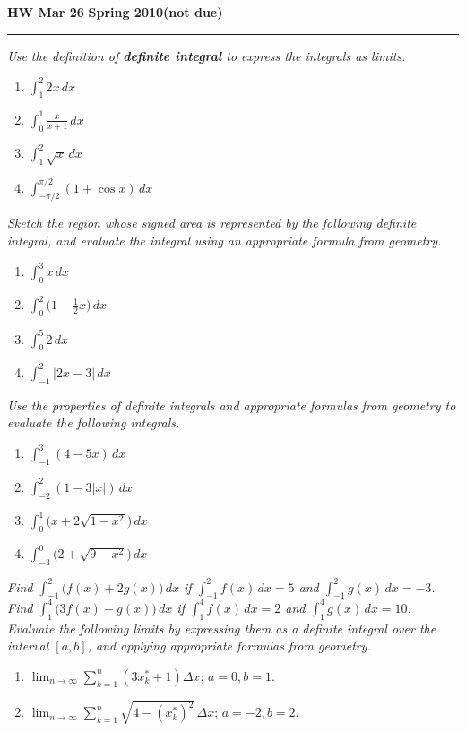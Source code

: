 \documentclass[12pt]{amsart}
\begin{document}
\hfill{\large\bf HW Mar 26}\hfill{\large\bf
  Spring 2010}\hfill{\large\bf (not due)}\hrule

\bigskip
{\problem \em Use the definition of \textbf{definite integral} to express the integrals as limits.}
\begin{enumerate}
\item $\displaystyle{\int_1^2 2x\, dx}$
\item $\displaystyle{\int_0^1 \frac{x}{x+1}\, dx}$
\item $\displaystyle{\int_1^2 \sqrt{x}\, dx}$
\item $\displaystyle{\int_{-\pi/2}^{\pi/2} (1+\cos x)\, dx}$
\end{enumerate}
{\problem \em Sketch the region whose signed area is represented by the following definite integral, and evaluate the integral using an appropriate formula from geometry.}
\begin{enumerate}
\item $\displaystyle{\int_0^3 x\, dx}$
\item $\displaystyle{\int_0^2 \big( 1 - \tfrac{1}{2}x \big)\, dx}$
\item $\displaystyle{\int_0^5 2\, dx}$
\item $\displaystyle{\int_{-1}^{2} \lvert 2x-3 \rvert\, dx}$
\end{enumerate}
{\problem \em Use the properties of definite integrals and appropriate formulas from geometry to evaluate the following integrals.}
\begin{enumerate}
\item $\displaystyle{\int_{-1}^3 (4-5x)\, dx}$
\item $\displaystyle{\int_{-2}^2 ( 1 - 3\lvert x \rvert)\, dx}$
\item $\displaystyle{\int_0^1 \big( x + 2 \sqrt{1-x^2} \big)\, dx}$
\item $\displaystyle{\int_{-3}^0 \big( 2 + \sqrt{9-x^2} \big)\, dx}$
\end{enumerate}
{\problem \em Find $\displaystyle{\int_{-1}^2 \big( f(x) + 2g(x) \big)\, dx}$ if $\displaystyle{\int_{-1}^2 f(x)\, dx = 5}$ and $\displaystyle{\int_{-1}^2 g(x)\, dx = -3}$.}
{\problem \em Find $\displaystyle{\int_{1}^4 \big( 3f(x) - g(x) \big)\, dx}$ if $\displaystyle{\int_1^4 f(x)\, dx = 2}$ and $\displaystyle{\int_1^4 g(x)\, dx = 10}$.}
{\problem \em Evaluate the following limits by expressing them as a definite integral over the interval $[a,b]$, and applying appropriate formulas from geometry.}
\begin{enumerate}
  \item $\displaystyle{\lim_{n \to \infty} \sum_{k=1}^n (3x_k^\ast +1) \Delta x}$; $a=0, b=1$.
  \item $\displaystyle{\lim_{n \to \infty} \sum_{k=1}^n \sqrt{4-(x_k^\ast)^2}\, \Delta x}$; $a=-2, b=2$.
\end{enumerate}
\end{document}
